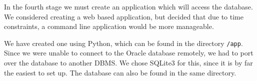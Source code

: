 In the fourth stage we must create an application which will access the database. We considered creating a web based application, but decided that due to time constraints, a command line application would be more manageable.

We have created one using Python, which can be found in the directory \verb`/app`. Since we were unable to connect to the Oracle database remotely, we had to port over the database to another DBMS. We chose SQLite3 for this, since it is by far the easiest to set up. The database can also be found in the same directory.